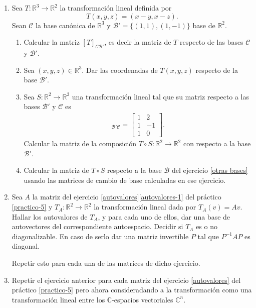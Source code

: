 \begin{enumerate}[topsep=6pt, itemsep=.4cm]
\item\label{matriz transformaciones ejemplo} Sea 
$T:\mathbb{R}^3\longrightarrow\mathbb{R}^2$ la transformación lineal definida por $$T(x,y,z)=(x-y,x-z).$$ Sean $\mathcal{C}$ la base canónica de $\mathbb{R}^3$ y $\mathcal{B}'=\{(1,1),(1,-1)\}$ base de $\mathbb{R}^2$.
\begin{enumerate}
    \item\label{matriz transformaciones ejemplo-a} Calcular la matriz $[T]_{\mathcal{C}\mathcal{B}'}$, es decir la matriz de $T$ respecto de las bases $\mathcal{C}$ y $\mathcal{B}'$.
    \item\label{matriz transformaciones ejemplo-b} Sea $(x,y,z)\in\mathbb{R}^3$. Dar las coordenadas de $T(x,y,z)$ respecto de la base $\mathcal{B}'$.
    \item\label{matriz transformaciones ejemplo-c} Sea $S:\mathbb{R}^2\longrightarrow\mathbb{R}^3$ una transformación lineal tal que su matriz respecto a las bases $\mathcal{B}'$ y $\mathcal{C}$ es
    \begin{align*}
    [S]_{\mathcal{B}'\mathcal{C}}=\begin{bmatrix}
    1&2\\1&-1\\1&0
    \end{bmatrix}. 
    \end{align*}
    Calcular la matriz de la composición $T\circ S:\mathbb{R}^2\longrightarrow\mathbb{R}^2$ con respecto a la base $\mathcal{B}'$. 
    \item\label{matriz transformaciones ejemplo-d} Calcular la matriz de $T\circ S$ respecto a la base $\mathcal{B}$ del ejercicio \ref{otras bases} usando las matrices de cambio de base calculadas en ese ejercicio.
\end{enumerate}



\item Sea $A$ la matriz  del ejercicio \ref{autovalores}\ref{autovalores-1} del práctico \ref{practico-5} y $T_A:\mathbb{R}^2\longrightarrow\mathbb{R}^2$ la transformación lineal dada por $T_A(v)=Av$. Hallar los autovalores de $T_A$, y para cada uno de ellos, dar una base de autovectores del correspondiente autoespacio. Decidir si $T_A$ es o no diagonalizable. En caso de serlo dar una matriz invertible $P$ tal que $P^{-1}AP$ es diagonal. 

Repetir esto para cada una de las matrices de dicho ejercicio.


\item Repetir el ejercicio anterior para cada matriz del ejercicio \ref{autovalores} del práctico \ref{practico-5} pero ahora consideradando a la transformación como una transformación lineal entre los $\mathbb{C}$-espacios vectoriales $\mathbb{C}^n$.



\end{enumerate}
